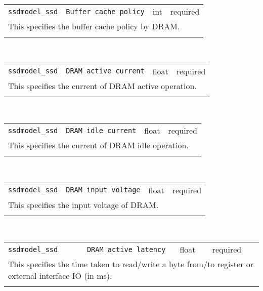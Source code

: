 \noindent 
\begin{tabular}{|p{\lpmodwidth}|p{\lpnamewidth}|p{0.5in}|p{0.5in}|}
\cline{1-4}
\texttt{ssdmodel\_ssd} & \texttt{Buffer cache policy} & int & required \\ 
\cline{1-4}
\multicolumn{4}{|p{6in}|}{
This specifies the buffer cache policy by DRAM.
}\\ 
\cline{1-4}
\multicolumn{4}{p{5in}}{}\\
\end{tabular}\\ 
\noindent 
\begin{tabular}{|p{\lpmodwidth}|p{\lpnamewidth}|p{0.5in}|p{0.5in}|}
\cline{1-4}
\texttt{ssdmodel\_ssd} & \texttt{DRAM active current} & float & required \\ 
\cline{1-4}
\multicolumn{4}{|p{6in}|}{
This specifies the current of DRAM active operation.
}\\ 
\cline{1-4}
\multicolumn{4}{p{5in}}{}\\
\end{tabular}\\ 
\noindent 
\begin{tabular}{|p{\lpmodwidth}|p{\lpnamewidth}|p{0.5in}|p{0.5in}|}
\cline{1-4}
\texttt{ssdmodel\_ssd} & \texttt{DRAM idle current} & float & required \\ 
\cline{1-4}
\multicolumn{4}{|p{6in}|}{
This specifies the current of DRAM idle operation.
}\\ 
\cline{1-4}
\multicolumn{4}{p{5in}}{}\\
\end{tabular}\\ 
\noindent 
\begin{tabular}{|p{\lpmodwidth}|p{\lpnamewidth}|p{0.5in}|p{0.5in}|}
\cline{1-4}
\texttt{ssdmodel\_ssd} & \texttt{DRAM input voltage} & float & required \\ 
\cline{1-4}
\multicolumn{4}{|p{6in}|}{
This specifies the input voltage of DRAM.
}\\ 
\cline{1-4}
\multicolumn{4}{p{5in}}{}\\
\end{tabular}\\ 
\noindent 
\begin{tabular}{|p{\lpmodwidth}|p{\lpnamewidth}|p{0.5in}|p{0.5in}|}
\cline{1-4}
\texttt{ssdmodel\_ssd} & \texttt{DRAM active latency} & float & required \\ 
\cline{1-4}
\multicolumn{4}{|p{6in}|}{
This specifies the time taken to read/write a byte from/to register
or external interface IO (in ms).
}\\ 
\cline{1-4}
\multicolumn{4}{p{5in}}{}\\
\end{tabular}\\ 
